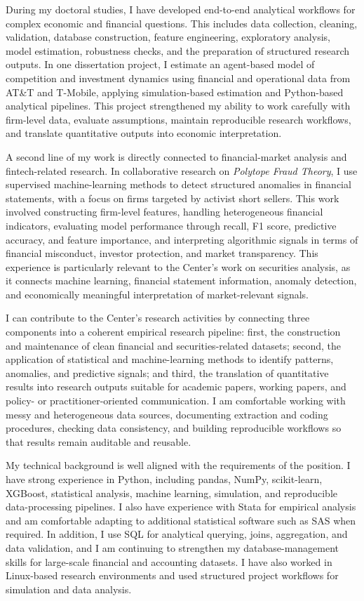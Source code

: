 \documentclass[11pt]{article}
\begin{document}
During my doctoral studies, I have developed end-to-end analytical workflows for complex economic and financial questions. This includes data collection, cleaning, validation, database construction, feature engineering, exploratory analysis, model estimation, robustness checks, and the preparation of structured research outputs. In one dissertation project, I estimate an agent-based model of competition and investment dynamics using financial and operational data from AT\&T and T-Mobile, applying simulation-based estimation and Python-based analytical pipelines. This project strengthened my ability to work carefully with firm-level data, evaluate assumptions, maintain reproducible research workflows, and translate quantitative outputs into economic interpretation.

A second line of my work is directly connected to financial-market analysis and fintech-related research. In collaborative research on \emph{Polytope Fraud Theory}, I use supervised machine-learning methods to detect structured anomalies in financial statements, with a focus on firms targeted by activist short sellers. This work involved constructing firm-level features, handling heterogeneous financial indicators, evaluating model performance through recall, F1 score, predictive accuracy, and feature importance, and interpreting algorithmic signals in terms of financial misconduct, investor protection, and market transparency. This experience is particularly relevant to the Center's work on securities analysis, as it connects machine learning, financial statement information, anomaly detection, and economically meaningful interpretation of market-relevant signals.

I can contribute to the Center's research activities by connecting three components into a coherent empirical research pipeline: first, the construction and maintenance of clean financial and securities-related datasets; second, the application of statistical and machine-learning methods to identify patterns, anomalies, and predictive signals; and third, the translation of quantitative results into research outputs suitable for academic papers, working papers, and policy- or practitioner-oriented communication. I am comfortable working with messy and heterogeneous data sources, documenting extraction and coding procedures, checking data consistency, and building reproducible workflows so that results remain auditable and reusable.

My technical background is well aligned with the requirements of the position. I have strong experience in Python, including pandas, NumPy, scikit-learn, XGBoost, statistical analysis, machine learning, simulation, and reproducible data-processing pipelines. I also have experience with Stata for empirical analysis and am comfortable adapting to additional statistical software such as SAS when required. In addition, I use SQL for analytical querying, joins, aggregation, and data validation, and I am continuing to strengthen my database-management skills for large-scale financial and accounting datasets. I have also worked in Linux-based research environments and used structured project workflows for simulation and data analysis.
\end{document}

